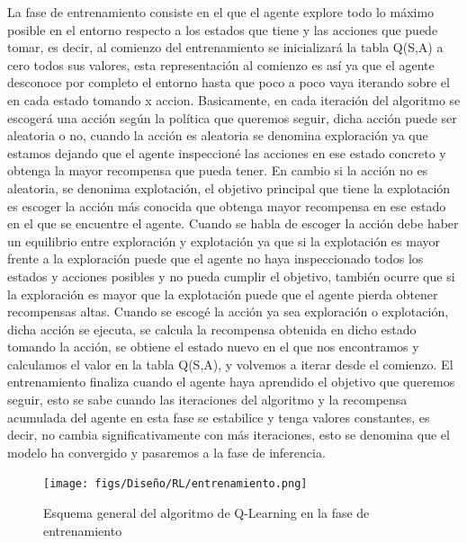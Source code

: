  
 La fase de entrenamiento consiste en el que el agente explore todo lo máximo posible en el entorno respecto a los estados que tiene y las acciones que puede tomar, es decir, al comienzo del entrenamiento se inicializará la tabla Q(S,A) a cero todos sus valores, esta representación
 al comienzo es así ya que el agente desconoce por completo el entorno hasta que poco a poco vaya iterando sobre el en cada estado tomando x accion. \newline
 \newline
 Basicamente, en cada iteración del algoritmo se escogerá una acción según la política que queremos seguir, dicha acción puede ser aleatoria o no, cuando la acción es aleatoria se denomina exploración ya que estamos dejando que el 
 agente inspeccioné las acciones en ese estado concreto y obtenga la mayor recompensa que pueda tener. 
 En cambio si la acción no es aleatoria, se denonima explotación, el objetivo
 principal que tiene la explotación es escoger la acción más conocida que obtenga mayor recompensa en ese estado en el que se encuentre el agente. Cuando se habla de escoger la acción debe 
 haber un equilibrio entre exploración y explotación ya que si la explotación es mayor frente a la exploración puede que el agente no haya inspeccionado todos los estados y acciones 
 posibles y no pueda cumplir el objetivo, también ocurre que si la exploración es mayor que la explotación puede que el agente pierda obtener recompensas altas. \newline
 \newline
 Cuando se escogé la acción ya sea exploración o explotación, dicha acción se ejecuta, se calcula la recompensa obtenida en dicho estado tomando la acción, se obtiene el estado nuevo en el que 
 nos encontramos y calculamos el valor en la tabla Q(S,A), y volvemos a iterar desde el comienzo. \newline
 \newline
 El entrenamiento finaliza cuando el agente haya aprendido el objetivo que queremos seguir, esto se sabe cuando las iteraciones del algoritmo y la recompensa acumulada del agente en esta 
 fase se estabilice y tenga valores constantes, es decir, no cambia significativamente con más iteraciones, esto se denomina que el modelo ha convergido y pasaremos a la fase de inferencia. 


 \begin{figure} [H]
  \begin{center}
    \texttt{[image: figs/Diseño/RL/entrenamiento.png]}
  \end{center}
  \caption{Esquema general del algoritmo de Q-Learning en la fase de entrenamiento}
  \label{fig:algoritmo de Q-Learning}
\end{figure}

